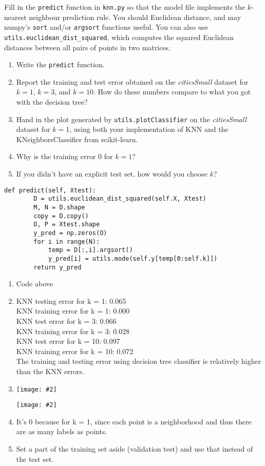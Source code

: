 \documentclass{article}
\def\blu#1{{\color{blu}#1}}
\def\red#1{{\color{red}#1}}
\newcommand{\centerfig}[2]{\begin{center}\texttt{[image: \#2]}\end{center}}
\def\enum#1{\begin{enumerate}#1\end{enumerate}}
\begin{document}
Fill in the \texttt{predict} function in \texttt{knn.py} so that the model file implements the $k$-nearest neighbour prediction rule.
You should Euclidean distance, and may numpy's \texttt{sort} and/or \texttt{argsort} functions useful.
You can also use \texttt{utils.euclidean\string_dist\string_squared}, which computes the squared Euclidean distances between all pairs of points in two matrices.
\blu{
\enum{
\item Write the \texttt{predict} function.
\item Report  the training and test error obtained on the \emph{citiesSmall} dataset for $k=1$, $k=3$, and $k=10$. How do these numbers compare to what you got with the decision tree?
\item Hand in the plot generated by \texttt{utils.plotClassifier} on the \emph{citiesSmall} dataset for $k=1$, using both your implementation of KNN and the KNeighborsClassifier from scikit-learn.
\item Why is the training error $0$ for $k=1$?
\item If you didn't have an explicit test set, how would you choose $k$?
}}
\begin{lstlisting}
def predict(self, Xtest):
        D = utils.euclidean_dist_squared(self.X, Xtest)
        M, N = D.shape
        copy = D.copy()
        O, P = Xtest.shape
        y_pred = np.zeros(O)
        for i in range(N):
            temp = D[:,i].argsort()
            y_pred[i] = utils.mode(self.y[temp[0:self.k]])
        return y_pred
\end{lstlisting}
\red{ \enum{
\item Code above
\item 
KNN testing error for k = 1: 0.065 \\
KNN training error for k = 1: 0.000 \\
KNN test error for k = 3: 0.066 \\
KNN training error for k = 3: 0.028 \\
KNN test error for k = 10: 0.097 \\
KNN training error for k = 10: 0.072 \\
The training and testing error using decision tree classifier is relatively higher than the KNN errors.
\item \centerfig{.5}{./figs/knnDecisionBoundary.pdf} \centerfig{.5}{./figs/knnDecisionBoundary_sklearn.pdf}
\item It's 0 because for k = 1, since each point is a neighborhood and thus there are as many labels as points.
\item Set a part of the training set aside (validation test) and use that instead of the test set.
}}
\end{document}
